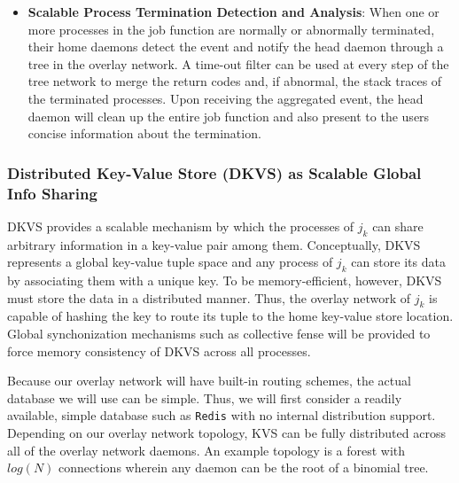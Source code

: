 \documentclass[10pt]{article}
\begin{document}
\begin{itemize}
\item{{\bf Scalable Process Termination Detection and Analysis}: When one or more processes
in the job function are normally or abnormally terminated, their home daemons detect the event and notify 
the head daemon through a tree in the overlay network. A time-out filter can be used at every step of 
the tree network to merge the return codes and, if abnormal, the stack traces of 
the terminated processes. Upon receiving the aggregated
event, the head daemon will clean up the entire job function and also present 
to the users concise information about the termination.}

\end{itemize}

\subsubsection{Distributed Key-Value Store (DKVS) as Scalable Global Info Sharing}
\label{sect:dkvs}
DKVS provides a scalable mechanism by which the processes of $j_k$ can
share arbitrary information in a key-value pair among them. 
Conceptually, DKVS represents a global key-value tuple space 
and any process of $j_k$ can store its data by associating them 
with a unique key. To be memory-efficient,
however, DKVS must store the data in a distributed
manner. Thus, the overlay network of $j_k$ is capable of hashing the key 
to route its tuple to the home key-value store location. Global synchonization
mechanisms such as collective fense will be provided to force 
memory consistency of DKVS across all processes. 

Because our overlay network will have built-in routing 
schemes, the actual database we will use can be simple. 
Thus, we will first consider a readily available, simple 
database such as {\tt Redis} with no internal distribution support.
Depending on our overlay network topology, 
KVS can be fully distributed across all of the overlay network daemons. 
An example topology is a forest 
with $log(N)$ connections wherein any daemon can be
the root of a binomial tree. 
\end{document}
